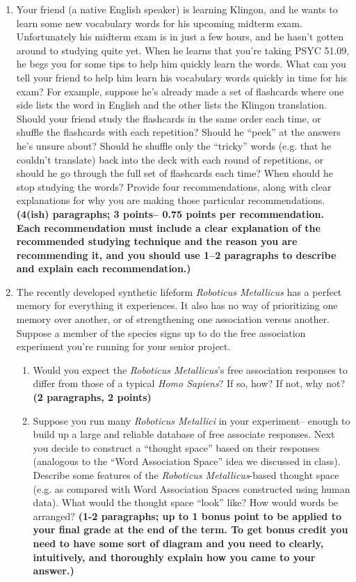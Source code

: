 \documentclass[10pt]{article}
\begin{document}
\begin{enumerate}
\item Your friend (a native English speaker) is learning Klingon, and
  he wants to learn some new vocabulary words for his upcoming midterm
  exam.  Unfortunately his midterm exam is in just a few hours, and he
  hasn't gotten around to studying quite yet.  When he learns that
  you're taking PSYC 51.09, he begs you for some tips to help him
  quickly learn the words.  What can you tell your friend to help him
  learn his vocabulary words quickly in time for his exam?  For
  example, suppose he's already made a set of flashcards where one
  side lists the word in English and the other lists the Klingon
  translation.  Should your friend study the flashcards in the same
  order each time, or shuffle the flashcards with each repetition?
  Should he ``peek'' at the answers he's unsure about?  Should he
  shuffle only the ``tricky'' words (e.g. that he couldn't translate)
  back into the deck with each round of repetitions, or should he go
  through the full set of flashcards each time?  When should he stop
  studying the words?  Provide four recommendations, along with clear
  explanations for why you are making those particular
  recommendations.  \textbf{(4(ish) paragraphs; 3 points-- 0.75 points per
    recommendation.  Each recommendation must include a clear
    explanation of the recommended studying technique and the reason
    you are recommending it, and you should use 1--2 paragraphs to
    describe and explain each recommendation.)}

\item The recently developed synthetic lifeform \textit{Roboticus Metallicus} has a
  perfect memory for everything it experiences.  It also has no way of
  prioritizing one memory over another, or of strengthening one
  association versus another.  Suppose a member of the species signs
  up to do the free association experiment you're running for your
  senior project.
\begin{enumerate}
\item Would you expect the \textit{Roboticus Metallicus}'s free
  association responses to differ from those of a typical \textit{Homo
    Sapiens}?  If so, how?  If not, why not?  \textbf{(2 paragraphs, 2
    points)}
\item Suppose you run many \textit{Roboticus Metallici} in your
  experiment-- enough to build up a large and reliable database of free
  associate responses.  Next you decide to construct a ``thought space''
  based on their responses (analogous to the ``Word Association
  Space'' idea we discussed in class).  Describe some features of the
  \textit{Roboticus Metallicus}-based thought space (e.g. as compared
  with Word Association Spaces constructed using human data).
  What would the thought space ``look'' like?  How would words be
  arranged?
  \textbf{(1-2 paragraphs; up to 1 bonus point to be applied to your
    final grade at the end of the term.  To get bonus credit you
    need to have some sort of diagram and you need to clearly, 
    intuitively, and thoroughly explain how you came to your answer.)}
\end{enumerate}
\end{enumerate}
\end{document}
